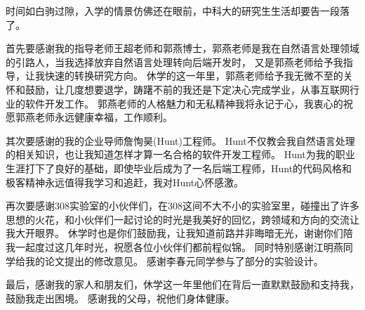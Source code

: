 
\begin{acknowledgements}

时间如白驹过隙，入学的情景仿佛还在眼前，中科大的研究生生活却要告一段落了。

首先要感谢我的指导老师王超老师和郭燕博士，郭燕老师是我在自然语言处理领域的引路人，当我选择放弃自然语言处理转向后端开发时，
又是郭燕老师给予我指导，让我快速的转换研究方向。 休学的这一年里，郭燕老师给予我无微不至的关怀和鼓励，让几度想要退学，踌躇不前的我还是下定决心完成学业，从事互联网行业的软件开发工作。
郭燕老师的人格魅力和无私精神我将永记于心，我衷心的祝愿郭燕老师永远健康幸福，工作顺利。

其次要感谢的我的企业导师詹恂昊(Hunt)工程师。 Hunt不仅教会我自然语言处理的相关知识，也让我知道怎样才算一名合格的软件开发工程师。
Hunt为我的职业生涯打下了良好的基础，即使毕业后成为了一名后端工程师，Hunt的代码风格和极客精神永远值得我学习和追赶，我对Hunt心怀感激。

再次要感谢308实验室的小伙伴们，在308这间不大不小的实验室里，碰撞出了许多思想的火花，和小伙伴们一起讨论的时光是我美好的回忆，跨领域和方向的交流让我大开眼界。
休学时也是你们鼓励我，让我知道前路并非晦暗无光，谢谢你们陪我一起度过这几年时光，祝愿各位小伙伴们都前程似锦。 同时特别感谢江明燕同学给我的论文提出的修改意见。
感谢李春元同学参与了部分的实验设计。

最后，感谢我的家人和朋友们，休学这一年里他们在背后一直默默鼓励和支持我，鼓励我走出困境。 感谢我的父母，祝他们身体健康。

\end{acknowledgements}
